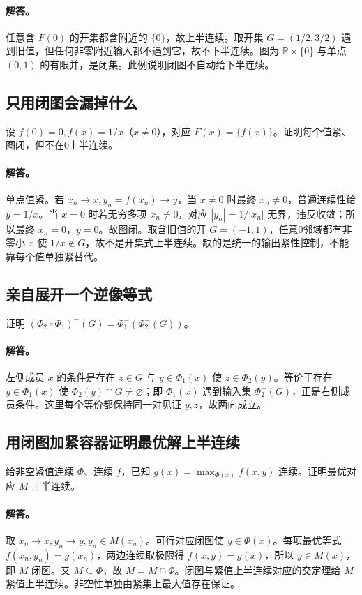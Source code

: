 \documentclass[11pt,a4paper]{article}
\newcommand{\R}{\mathbb{R}}\newcommand{\N}{\mathbb{N}}
\theoremstyle{definition}\newtheorem{definition}{定义}\newtheorem{example}{例}
\begin{document}
\paragraph{解答。}任意含 $F(0)$ 的开集都含附近的 $\{0\}$，故上半连续。取开集 $G=(1/2,3/2)$ 遇到旧值，但任何非零附近输入都不遇到它，故不下半连续。图为 $\R\times\{0\}$ 与单点 $(0,1)$ 的有限并，是闭集。此例说明闭图不自动给下半连续。
\subsection{只用闭图会漏掉什么}
设 $f(0)=0,f(x)=1/x$（$x\ne0$），对应 $F(x)=\{f(x)\}$。证明每个值紧、图闭，但不在0上半连续。
\paragraph{解答。}单点值紧。若 $x_n\to x,y_n=f(x_n)\to y$，当 $x\ne0$ 时最终 $x_n\ne0$，普通连续性给 $y=1/x$。当 $x=0$ 时若无穷多项 $x_n\ne0$，对应 $|y_n|=1/|x_n|$ 无界，违反收敛；所以最终 $x_n=0$，$y=0$。故图闭。取含旧值的开 $G=(-1,1)$，任意0邻域都有非零小 $x$ 使 $1/x\notin G$，故不是开集式上半连续。缺的是统一的输出紧性控制，不能靠每个值单独紧替代。
\subsection{亲自展开一个逆像等式}
证明 $(\Phi_2\circ\Phi_1)^-(G)=\Phi_1^-(\Phi_2^-(G))$。
\paragraph{解答。}左侧成员 $x$ 的条件是存在 $z\in G$ 与 $y\in\Phi_1(x)$ 使 $z\in\Phi_2(y)$。等价于存在 $y\in\Phi_1(x)$ 使 $\Phi_2(y)\cap G\ne\varnothing$；即 $\Phi_1(x)$ 遇到输入集 $\Phi_2^-(G)$，正是右侧成员条件。这里每个等价都保持同一对见证 $y,z$，故两向成立。
\subsection{用闭图加紧容器证明最优解上半连续}
给非空紧值连续 $\Phi$、连续 $f$，已知 $g(x)=\max_{\Phi(x)}f(x,y)$ 连续。证明最优对应 $M$ 上半连续。
\paragraph{解答。}取 $x_n\to x,y_n\to y,y_n\in M(x_n)$。可行对应闭图使 $y\in\Phi(x)$。每项最优等式 $f(x_n,y_n)=g(x_n)$，两边连续取极限得 $f(x,y)=g(x)$，所以 $y\in M(x)$，即 $M$ 闭图。又 $M\subseteq\Phi$，故 $M=M\cap\Phi$。闭图与紧值上半连续对应的交定理给 $M$ 紧值上半连续。非空性单独由紧集上最大值存在保证。
\end{document}
